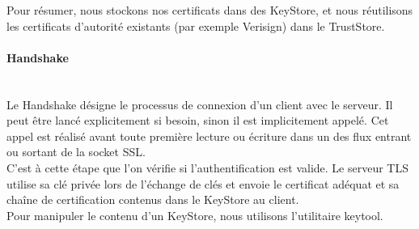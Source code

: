 Pour résumer, nous stockons nos certificats dans des KeyStore, et nous réutilisons les certificats d'autorité existants (par exemple Verisign) dans le TrustStore.


\paragraph{Handshake}
~~\\

Le Handshake désigne le processus de connexion d'un client avec le serveur.
Il peut être lancé explicitement si besoin, sinon il est implicitement appelé. Cet appel est réalisé avant toute première lecture ou écriture dans un des flux entrant ou sortant de la socket SSL.
~~\\

C'est à cette étape que l'on vérifie si l'authentification est valide. Le serveur TLS utilise sa clé privée lors de l'échange de clés et envoie le certificat adéquat et sa chaîne de certification contenus dans le KeyStore au client.
~~\\

Pour manipuler le contenu d'un KeyStore, nous utilisons l'utilitaire keytool.